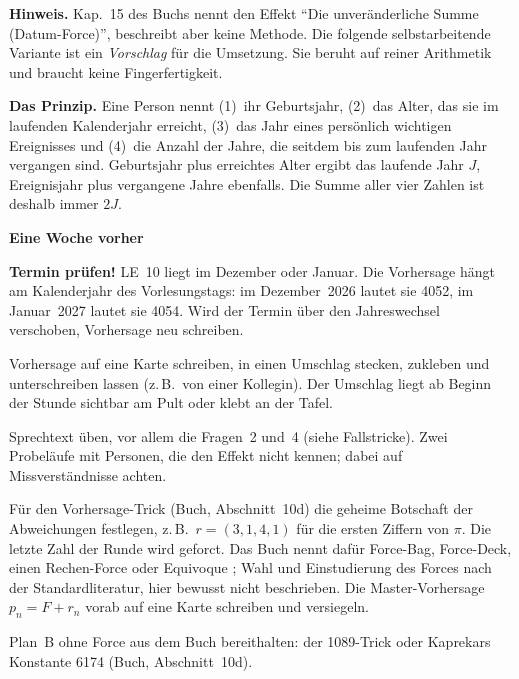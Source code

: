 \begin{vorbereitung}
\textbf{Hinweis.} Kap.~15 des Buchs nennt den Effekt \enquote{Die
unveränderliche Summe (Datum-Force)}, beschreibt aber keine Methode. Die
folgende selbstarbeitende Variante ist ein \emph{Vorschlag} für die
Umsetzung. Sie beruht auf reiner Arithmetik und braucht keine
Fingerfertigkeit.

\textbf{Das Prinzip.} Eine Person nennt (1)~ihr Geburtsjahr, (2)~das
Alter, das sie im laufenden Kalenderjahr erreicht, (3)~das Jahr eines
persönlich wichtigen Ereignisses und (4)~die Anzahl der Jahre, die seitdem
bis zum laufenden Jahr vergangen sind. Geburtsjahr plus erreichtes Alter
ergibt das laufende Jahr $J$, Ereignisjahr plus vergangene Jahre ebenfalls.
Die Summe aller vier Zahlen ist deshalb immer $2J$.

\textbf{Eine Woche vorher}
\begin{checkliste}
  \item \textbf{Termin prüfen!} LE~10 liegt im Dezember oder Januar. Die
    Vorhersage hängt am Kalenderjahr des Vorlesungstags: im Dezember~2026
    lautet sie 4052, im Januar~2027 lautet sie 4054. Wird der Termin über
    den Jahreswechsel verschoben, Vorhersage neu schreiben.
  \item Vorhersage auf eine Karte schreiben, in einen Umschlag stecken,
    zukleben und unterschreiben lassen (z.\,B.\ von einer Kollegin). Der
    Umschlag liegt ab Beginn der Stunde sichtbar am Pult oder klebt an der
    Tafel.
  \item Sprechtext üben, vor allem die Fragen~2 und~4 (siehe
    Fallstricke). Zwei Probeläufe mit Personen, die den Effekt nicht
    kennen; dabei auf Missverständnisse achten.
  \item Für den Vorhersage-Trick (Buch, Abschnitt~10d) die geheime
    Botschaft der Abweichungen festlegen, z.\,B.\ $r=(3,1,4,1)$ für die
    ersten Ziffern von $\pi$. Die letzte Zahl der Runde wird geforct. Das
    Buch nennt dafür Force-Bag, Force-Deck, einen Rechen-Force oder
    Equivoque \parencite{pailhes2020}; Wahl und Einstudierung des Forces
    nach der Standardliteratur, hier bewusst nicht beschrieben. Die
    Master-Vorhersage $p_n = F + r_n$ vorab auf eine Karte schreiben und
    versiegeln.
  \item Plan~B ohne Force aus dem Buch bereithalten: der 1089-Trick oder
    Kaprekars Konstante 6174 (Buch, Abschnitt~10d).
\end{checkliste}


\end{vorbereitung}
